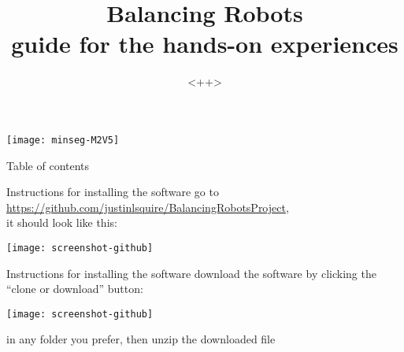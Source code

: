 \newif	\ifexternalize					%
\newif	\ifshowonlynotes				%
\newif	\ifhandout						%
\newif	\ifshowsolutions				%
\newif	\ifshownotes					%
\ifdefined\EXTERNALIZE	\externalizetrue	\fi						%
\ifdefined\ONLYNOTES	\showonlynotestrue	\fi						%
\ifdefined\HANDOUT		\handouttrue		\fi						%
\ifdefined\SOLUTIONS	\showsolutionstrue	\fi						%
\ifdefined\NOTES		\shownotestrue		\fi						%
\title		[Balancing Robots]	{Balancing Robots \\ guide for the hands-on experiences}
\date		{} %
\institute	[<++>]	{<++>}											%
\author		[<++>]	{<++>}											%


\begin{frame}
	\titlepage
	\begin{center}
		\texttt{[image: minseg-M2V5]}
	\end{center}
\end{frame}


\begin{frame}{Table of contents}
	\tableofcontents
\end{frame}




\begin{frame}[t]{Instructions for installing the software}
	go to \url{https://github.com/justinlsquire/BalancingRobotsProject}, \\ it should look like this:
	\begin{center}
		\texttt{[image: screenshot-github]}
	\end{center}
\end{frame}


\begin{frame}[t]{Instructions for installing the software}
	download the software by clicking the ``clone or download'' button:
	\begin{center}
		\texttt{[image: screenshot-github]}
	\end{center}
	in any folder you prefer, then unzip the downloaded file
\end{frame}


